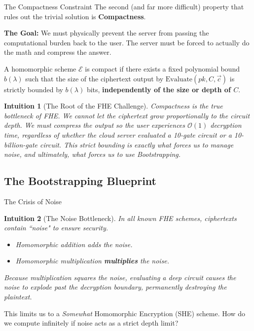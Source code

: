 \documentclass[10pt]{beamer}
\newtheorem{intuition}{Intuition}
\begin{document}
\begin{frame}{The Compactness Constraint}
    The second (and far more difficult) property that rules out the trivial solution is \textbf{Compactness}.
    \pause
    
    \vspace{0.3cm}
    \textbf{The Goal:} We must physically prevent the server from passing the computational burden back to the user. The server must be forced to actually do the math and compress the answer.
    \pause

    \begin{definition}[Compactness]
    A homomorphic scheme $\mathcal{E}$ is compact if there exists a fixed polynomial bound $b(\lambda)$ such that the size of the ciphertext output by $\text{Evaluate}(pk, C, \vec{c})$ is strictly bounded by $b(\lambda)$ bits, \textbf{independently of the size or depth of $C$}.
    \end{definition}
    \pause

    \begin{intuition}[The Root of the FHE Challenge]
    Compactness is the true bottleneck of FHE. We cannot let the ciphertext grow proportionally to the circuit depth. We must compress the output so the user experiences $\mathcal{O}(1)$ decryption time, regardless of whether the cloud server evaluated a 10-gate circuit or a 10-billion-gate circuit. This strict bounding is exactly what forces us to manage noise, and ultimately, what forces us to use Bootstrapping.
    \end{intuition}
\end{frame}

\subsection{The Bootstrapping Blueprint}

\begin{frame}{The Crisis of Noise}
    \begin{intuition}[The Noise Bottleneck]
    In all known FHE schemes, ciphertexts contain ``noise" to ensure security. 
    \begin{itemize}
        \item Homomorphic addition adds the noise.
        \item Homomorphic multiplication \textbf{multiplies} the noise.
    \end{itemize}
    Because multiplication squares the noise, evaluating a deep circuit causes the noise to explode past the decryption boundary, permanently destroying the plaintext.
    \end{intuition}
    \pause
    
    \vspace{0.3cm}
    This limits us to a \textit{Somewhat} Homomorphic Encryption (SHE) scheme. How do we compute infinitely if noise acts as a strict depth limit?
\end{frame}
\end{document}

